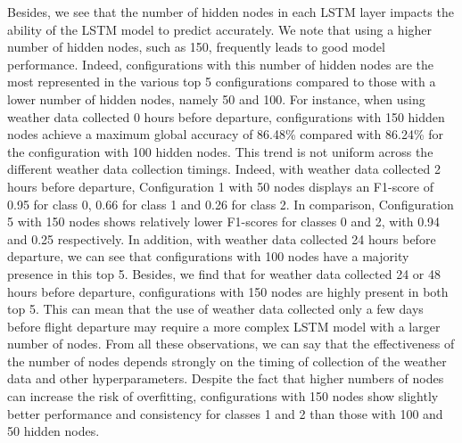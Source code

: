 \documentclass[12pt,oneside]{book} %
\begin{document}
\noindent Besides, we see that the number of hidden nodes in each LSTM layer impacts the ability of the LSTM model to predict accurately. We note that using a higher number of hidden nodes, such as 150, frequently leads to good model performance. Indeed, configurations with this number of hidden nodes are the most represented in the various top 5 configurations compared to those with a lower number of hidden nodes, namely 50 and 100. For instance, when using weather data collected 0 hours before departure, configurations with 150 hidden nodes achieve a maximum global accuracy of 86.48\% compared with 86.24\% for the configuration with 100 hidden nodes. This trend is not uniform across the different weather data collection timings. Indeed, with weather data collected 2 hours before departure, Configuration 1 with 50 nodes displays an F1-score of 0.95 for class 0, 0.66 for class 1 and 0.26 for class 2. In comparison, Configuration 5 with 150 nodes shows relatively lower F1-scores for classes 0 and 2, with 0.94 and 0.25 respectively. In addition, with weather data collected 24 hours before departure, we can see that configurations with 100 nodes have a majority presence in this top 5. Besides, we find that for weather data collected 24 or 48 hours before departure, configurations with 150 nodes are highly present in both top 5. This can mean that the use of weather data collected only a few days before flight departure may require a more complex LSTM model with a larger number of nodes. From all these observations, we can say that the effectiveness of the number of nodes depends strongly on the timing of collection of the weather data and other hyperparameters. Despite the fact that higher numbers of nodes can increase the risk of overfitting, configurations with 150 nodes show slightly better performance and consistency for classes 1 and 2 than those with 100 and 50 hidden nodes.
\end{document}
